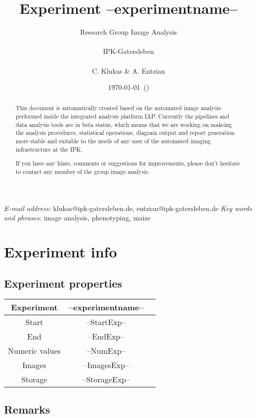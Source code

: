 \documentclass[%
  paper=a4, %
  pagesize, %
  DIV=calc, %
  headings=small,%
  english,   %
  oneside
]{scrartcl}  %
\providecommand{\tabularnewline}{\\}
\begin{document}
\title{Experiment --experimentname--}
\author{Research Group Image Analysis\tabularnewline \tabularnewline
IPK-Gatersleben\tabularnewline \tabularnewline C. Klukas \& A. Entzian}

\date{\today ~(\currenttime )}

\maketitle
\thispagestyle{empty}  
\begin{abstract}
This document is automatically created based on the automated image analysis performed 
inside the integrated analysis platform IAP. Currently the pipelines and data analysis tools are in beta status, 
which means that we are working on makeing the analysis procedures, statistical operations, diagram output and report
generation more stable and suitable to the needs of any user of the automated imaging infrastructure at the IPK.

If you have any hints, comments or suggestions for improvements, please don't hesitate to contact any member
of the group image analysis.
\end{abstract}
\vfill
\small{\textit{E-mail address:} klukas@ipk-gatersleben.de, entzian@ipk-gatersleben.de}
\newline 
\small{\textit{Key words and phrases:} image analysis, phenotyping, maize }
 

\clearpage
\tableofcontents

\clearpage
\pagestyle{headings}
\section{Experiment info} 
\subsection{Experiment properties}


\begin{tabular}{|c|c|c|}
\hline 
Experiment & --experimentname--\tabularnewline
\hline 
\hline 
Start & --StartExp--\tabularnewline
\hline 
End & --EndExp--\tabularnewline
\hline 
Numeric values & --NumExp-- \tabularnewline
\hline 
Images & --ImagesExp-- \tabularnewline
\hline 
Storage & --StorageExp-- \tabularnewline
\hline 
\end{tabular}


\subsection{Remarks}
\end{document}
